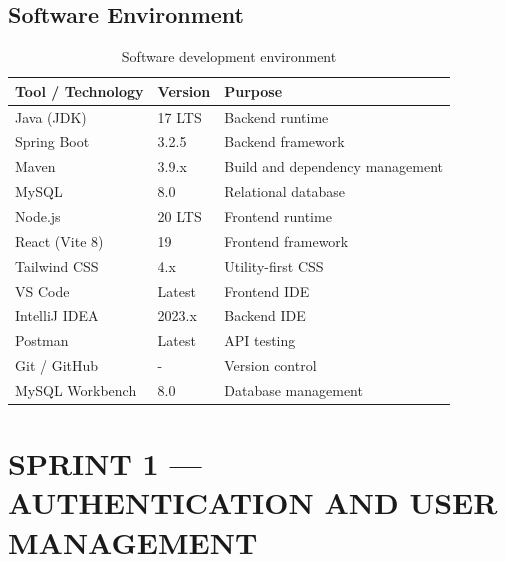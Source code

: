 \subsection{Software Environment}
\begin{table}[H]
\centering
\begin{tabular}{|p{4cm}|p{4cm}|p{5cm}|}
\hline
\rowcolor{gray!20}
\textbf{Tool / Technology} & \textbf{Version} & \textbf{Purpose} \\
\hline
Java (JDK) & 17 LTS & Backend runtime \\
\hline
Spring Boot & 3.2.5 & Backend framework \\
\hline
Maven & 3.9.x & Build and dependency management \\
\hline
MySQL & 8.0 & Relational database \\
\hline
Node.js & 20 LTS & Frontend runtime \\
\hline
React (Vite 8) & 19 & Frontend framework \\
\hline
Tailwind CSS & 4.x & Utility-first CSS \\
\hline
VS Code & Latest & Frontend IDE \\
\hline
IntelliJ IDEA & 2023.x & Backend IDE \\
\hline
Postman & Latest & API testing \\
\hline
Git / GitHub & - & Version control \\
\hline
MySQL Workbench & 8.0 & Database management \\
\hline
\end{tabular}
\caption{Software development environment}
\end{table}

\section{SPRINT 1 — AUTHENTICATION AND USER MANAGEMENT}

